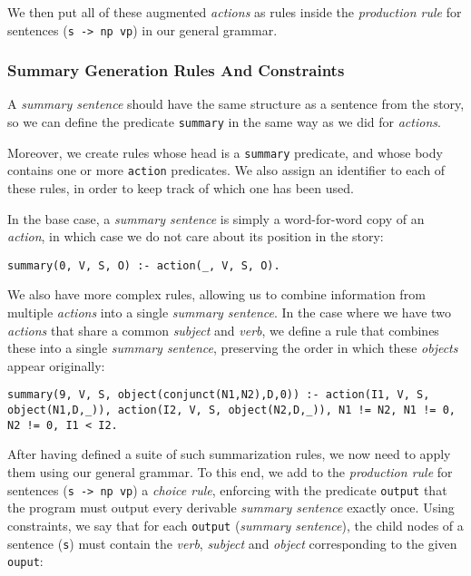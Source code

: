 We then put all of these augmented \textit{actions} as rules inside the \textit{production rule} for sentences (\texttt{s -> np vp}) in our general grammar. 

\subsubsection*{Summary Generation Rules And Constraints}

A \textit{summary sentence} should have the same structure as a sentence from the story, so we can define the predicate \texttt{summary} in the same way as we did for \textit{actions}.

Moreover, we create rules whose head is a \texttt{summary} predicate, and whose body contains one or more \texttt{action} predicates. We also assign an identifier to each of these rules, in order to keep track of which one has been used.

In the base case, a \textit{summary sentence} is simply a word-for-word copy of an \textit{action}, in which case we do not care about its position in the story:

\begin{displayquote}
\begin{lstlisting}[numbers=none]
summary(0, V, S, O) :- action(_, V, S, O).
\end{lstlisting}
\end{displayquote}

\noindent
We also have more complex rules, allowing us to combine information from multiple \textit{actions} into a single \textit{summary sentence}. In the case where we have two \textit{actions} that share a common \textit{subject} and \textit{verb}, we define a rule that combines these into a single \textit{summary sentence}, preserving the order in which these \textit{objects} appear originally:

\begin{displayquote}
\begin{lstlisting}[numbers=none]
summary(9, V, S, object(conjunct(N1,N2),D,0)) :- action(I1, V, S, object(N1,D,_)), action(I2, V, S, object(N2,D,_)), N1 != N2, N1 != 0, N2 != 0, I1 < I2.
\end{lstlisting}
\end{displayquote}

\noindent
After having defined a suite of such summarization rules, we now need to apply them using our general grammar. To this end, we add to the \textit{production rule} for sentences (\texttt{s -> np vp}) a \textit{choice rule}, enforcing with the predicate \texttt{output} that the program must output every derivable \textit{summary sentence} exactly once. Using constraints, we say that for each \texttt{output} (\textit{summary sentence}), the child nodes of a sentence (\texttt{s}) must contain the \textit{verb}, \textit{subject} and \textit{object} corresponding to the given \texttt{ouput}:

